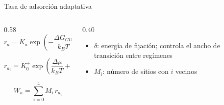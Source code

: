 \documentclass[aspectratio=169,11pt]{beamer}
\newcommand{\kB}{k_{B}}
\begin{document}
\begin{frame}{Tasa de adsorción adaptativa}
  \begin{columns}[c,onlytextwidth]
    \begin{column}{0.58\textwidth}
      \begin{equation}
        r_a = K_a \exp\!\left(-\frac{\Delta G_{GU}}{\kB T}\right) \tag{6}
      \end{equation}
      \vspace{-0.4em}
      \begin{block}{}
        \begin{equation}
          r_{a_i} = K_0^{+}\exp\!\left(\frac{\Delta\mu}{\kB T} + i\,\frac{\delta}{\Delta\mu}\right) \tag{7}
        \end{equation}
      \end{block}
      \begin{equation}
        W_a = \sum_{i=0}^{4} M_i\, r_{a_i} \tag{8}
      \end{equation}
    \end{column}
    \begin{column}{0.40\textwidth}
      \small
      \begin{itemize}\setlength{\itemsep}{0.6em}
        \vspace{0.95cm}
        \item $\delta$: energía de fijación; controla el ancho de transición entre regímenes
        \item $M_i$: número de sitios con $i$ vecinos
      \end{itemize}
    \end{column}
  \end{columns}
\end{frame}
\end{document}
